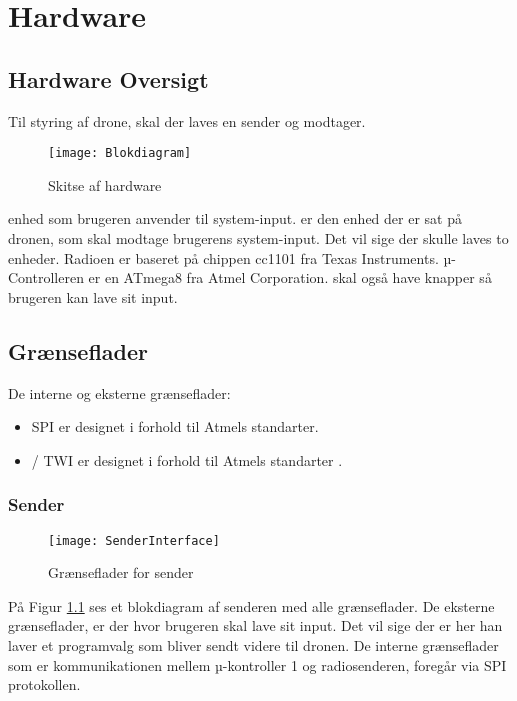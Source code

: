 \documentclass[Main]{subfiles}
\begin{document}
\chapter{Hardware}

\section{Hardware Oversigt}

Til styring af drone, skal der laves en sender og modtager.

\begin{figure}[H]
\centering
\texttt{[image: Blokdiagram]}
\caption{Skitse af hardware}
\end{figure}

 enhed som brugeren anvender til system-input.
 er den enhed der er sat på dronen, som skal modtage brugerens system-input.
Det vil sige der skulle laves to enheder. 
Radioen er baseret på chippen cc1101\cite{cc1101} fra Texas Instruments. 
µ-Controlleren er en ATmega8 fra Atmel Corporation.
 skal også have knapper så brugeren kan lave sit input.

\section{Grænseflader}
De interne og eksterne grænseflader:
\begin{itemize}
\item SPI er designet i forhold til Atmels standarter\cite{SPI}.
\item \itoc / TWI er designet i forhold til Atmels standarter \cite{Twi}.
\end{itemize}



\subsection{Sender}
\begin{figure}[H]
\centering
\texttt{[image: SenderInterface]}
\caption{Grænseflader for sender}
\label{fig: SenderInterface}
\end{figure}
På Figur \ref{fig: SenderInterface} ses et blokdiagram af senderen med alle grænseflader.
De eksterne grænseflader, er der hvor brugeren skal lave sit input. Det vil sige der er her han laver et programvalg som bliver sendt videre til dronen.
De interne grænseflader som er kommunikationen mellem µ-kontroller 1 og radiosenderen, foregår via SPI protokollen. 
\end{document}
